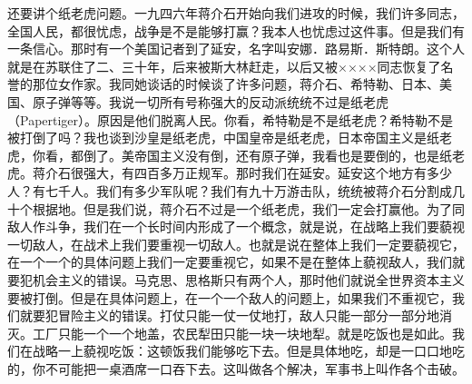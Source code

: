 还要讲个纸老虎问题。一九四六年蒋介石开始向我们进攻的时候，我们许多同志，全国人民，都很忧虑，战争是不是能够打赢？我本人也忧虑过这件事。但是我们有一条信心。那时有一个美国记者到了延安，名字叫安娜．路易斯．斯特朗。这个人就是在苏联住了二、三十年，后来被斯大林赶走，以后又被××××同志恢复了名誉的那位女作家。我同她谈话的时候谈了许多问题，蒋介石、希特勒、日本、美国、原子弹等等。我说一切所有号称强大的反动派统统不过是纸老虎（Papertiger）。原因是他们脱离人民。你看，希特勒是不是纸老虎？希特勒不是被打倒了吗？我也谈到沙皇是纸老虎，中国皇帝是纸老虎，日本帝国主义是纸老虎，你看，都倒了。美帝国主义没有倒，还有原子弹，我看也是要倒的，也是纸老虎。蒋介石很强大，有四百多万正规军。那时我们在延安。延安这个地方有多少人？有七千人。我们有多少军队呢？我们有九十万游击队，统统被蒋介石分割成几十个根据地。但是我们说，蒋介石不过是一个纸老虎，我们一定会打赢他。为了同敌人作斗争，我们在一个长时间内形成了一个概念，就是说，在战略上我们要藐视一切敌人，在战术上我们要重视一切敌人。也就是说在整体上我们一定要藐视它，在一个一个的具体问题上我们一定要重视它，如果不是在整体上藐视敌人，我们就要犯机会主义的错误。马克思、思格斯只有两个人，那时他们就说全世界资本主义要被打倒。但是在具体问题上，在一个一个敌人的问题上，如果我们不重视它，我们就要犯冒险主义的错误。打仗只能一仗一仗地打，敌人只能一部分一部分地消灭。工厂只能一个一个地盖，农民犁田只能一块一块地犁。就是吃饭也是如此。我们在战略一上藐视吃饭：这顿饭我们能够吃下去。但是具体地吃，却是一口口地吃的，你不可能把一桌酒席一口吞下去。这叫做各个解决，军事书上叫作各个击破。


